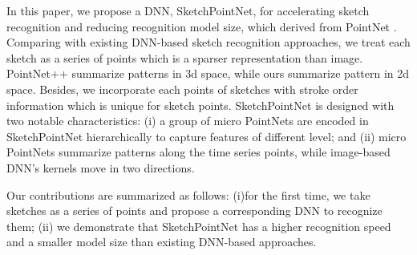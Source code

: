 In this paper, we propose a DNN, SketchPointNet, for accelerating sketch recognition and reducing recognition model size, which derived from PointNet \cite{qi2017pointnet}. Comparing with existing DNN-based sketch recognition approaches, we treat each sketch as a series of points which is a sparser representation than image. PointNet++ \cite{qi2017pointnetplusplus} summarize patterns in 3d space, while ours summarize pattern in 2d space. Besides, we incorporate each points of sketches with stroke order information which is unique for sketch points. SketchPointNet is designed with two notable characteristics: (i) a group of micro PointNets are encoded in SketchPointNet hierarchically to capture features of different level; and (ii) micro PointNets summarize patterns along the time series points, while image-based DNN's kernels move in two directions.

Our contributions are summarized as follows: (i)for the first time, we take sketches as a series of points and propose a corresponding DNN to recognize them; (ii) we demonstrate that SketchPointNet has a higher recognition speed and a smaller model size than existing DNN-based approaches.
